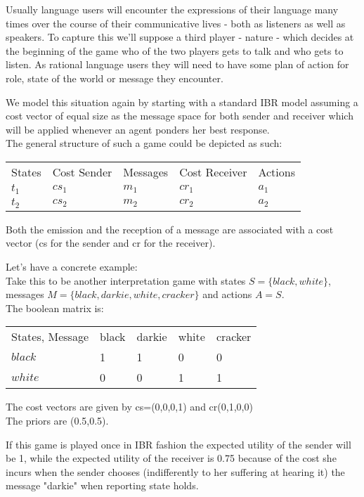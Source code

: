 \documentclass{article}
\begin{document}
Usually language users will encounter the expressions of their language many times over the course of their communicative lives - both as listeners as well as speakers. To capture this we'll suppose a third player - nature - which decides at the beginning of the game who of the two players gets to talk and who gets to listen. As rational language users they will need to have some plan of action for role, state of the world or message they encounter.

We model this situation again by starting with a standard IBR model assuming a cost vector of equal size as the message space for both sender and receiver which will be applied whenever an agent ponders her best response. \\
The general structure of such a game could be depicted as such:
\begin{table}[h]
\centering
\begin{tabular}{lllll}
States & Cost Sender & Messages & Cost Receiver & Actions \\
$t_1$  & $cs_1$      & $m_1$    & $cr_1$        & $a_1$   \\
$t_2$  & $cs_2$      & $m_2$    & $cr_2$        & $a_2$  
\end{tabular}
\end{table}
Both the emission and the reception of a message are associated with a cost vector (cs for the sender and cr for the receiver).

Let's have a concrete example:\\
Take this to be another interpretation game with states $S=\{black, white\}$, messages $M=\{black,darkie,white,cracker\}$ and actions $A=S$.\\
The boolean matrix is:

\begin{table}[h]
\centering
\begin{tabular}{lllll}
States, Message & black & darkie & white & cracker \\
$black$  & 1      & 1    & 0        & 0   \\
$white$  & 0     & 0   & 1       & 1 
\end{tabular}
\end{table}

The cost vectors are given by 
cs=(0,0,0,1) and cr(0,1,0,0)\\ %
The priors are (0.5,0.5).

If this game is played once in IBR fashion the expected utility of the sender will be 1, while the expected utility of the receiver is 0.75 because of the cost she incurs when the sender chooses (indifferently to her suffering at hearing it) the message "darkie" when reporting state holds.
\end{document}
